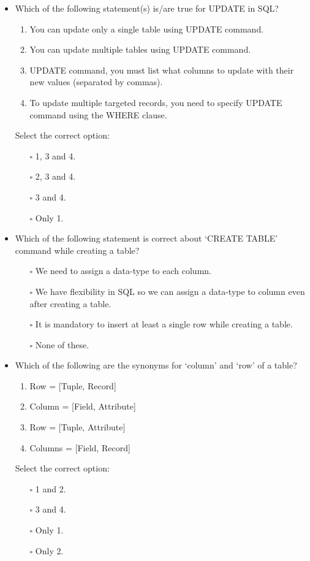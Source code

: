 \documentclass[10pt]{article}
\begin{document}
\begin{itemize}
			\item Which of the following statement(s) is/are true for UPDATE in SQL?
				\begin{enumerate}
					\item You can update only a single table using UPDATE command.
					\item You can update multiple tables using UPDATE command.
					\item UPDATE command, you must list what columns to update with their new values (separated by commas).
					\item To update multiple targeted records, you need to specify UPDATE command using the WHERE clause.
				\end{enumerate}
				Select the correct option:
				\begin{enumerate}
					\item[$\square$] 1, 3 and 4.
					\item[$\square$] 2, 3 and 4.
					\item[$\square$] 3 and 4.
					\item[$\square$] Only 1.
				\end{enumerate}
			
			\item Which of the following statement is correct about ‘CREATE TABLE’ command while creating a table?
				\begin{enumerate}
					\item[$\square$] We need to assign a data-type to each column.
					\item[$\square$] We have flexibility in SQL so we can assign a data-type to column even after creating a table.
					\item[$\square$] It is mandatory to insert at least a single row while creating a table.
					\item[$\square$] None of these.
				\end{enumerate}

			\item Which of the following are the synonyms for ‘column’ and ‘row’ of a table?
				\begin{enumerate}
					\item Row = [Tuple, Record]
					\item Column = [Field, Attribute]
					\item Row = [Tuple, Attribute]
					\item Columns = [Field, Record]
				\end{enumerate}
				Select the correct option:
				\begin{enumerate}
					\item[$\square$] 1 and 2.
					\item[$\square$] 3 and 4.
					\item[$\square$] Only 1.
					\item[$\square$] Only 2.
				\end{enumerate}


\end{itemize}
\end{document}
